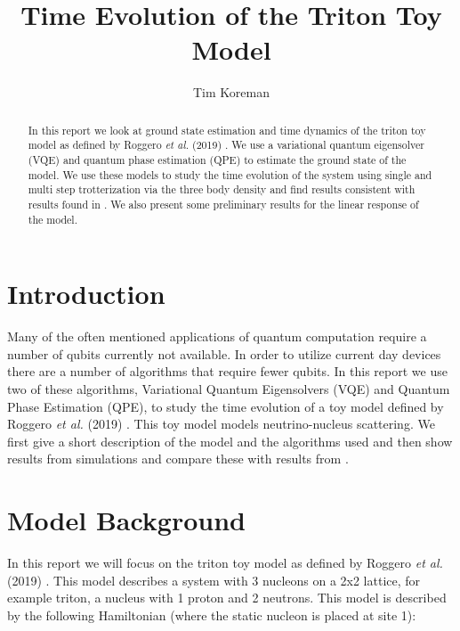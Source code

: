\documentclass[10 pt, a4paper]{article}
\title{Time Evolution of the Triton Toy Model}
\author{Tim Koreman}
\date{}
\begin{document}
\maketitle



\begin{abstract}
In this report we look at ground state estimation and time dynamics of the triton toy model as defined by Roggero \textit{et al.} (2019) \cite{neutscat}. We use a variational quantum eigensolver (VQE) and quantum phase estimation (QPE) to estimate the ground state of the model. We use these models to study the time evolution of the system using single and multi step trotterization via the three body density and find results consistent with results found in \cite{neutscat}. We also present some preliminary results for the linear response of the model.
\end{abstract}

\section{Introduction}

Many of the often mentioned applications of quantum computation require a number of qubits currently not available. In order to utilize current day devices there are a number of algorithms that require fewer qubits. In this report we use two of these algorithms, Variational Quantum Eigensolvers (VQE) and Quantum Phase Estimation (QPE), to study the time evolution of a toy model defined by Roggero \textit{et al.} (2019) \cite{neutscat}. This toy model models neutrino-nucleus scattering. We first give a short description of the model and the algorithms used and then show results from simulations and compare these with results from \cite{neutscat}.

\section{Model Background} \label{sec:modelback}


In this report we will focus on the triton toy model as defined by Roggero \textit{et al.} (2019) \cite{neutscat}. This model describes a system with 3 nucleons on a 2x2 lattice, for example triton, a nucleus with 1 proton and 2 neutrons. This model is described by the following Hamiltonian (where the static nucleon is placed at site 1): 
\end{document}
